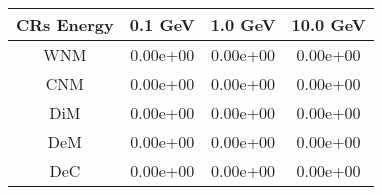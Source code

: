 \begin{tabular}{cccc} 
\hline 
CRs Energy & 0.1 GeV & 1.0 GeV & 10.0 GeV \\ 
\hline 
WNM & 0.00e+00  & 0.00e+00  & 0.00e+00 \\ 
CNM & 0.00e+00  & 0.00e+00  & 0.00e+00 \\ 
DiM & 0.00e+00  & 0.00e+00  & 0.00e+00 \\ 
DeM & 0.00e+00  & 0.00e+00  & 0.00e+00 \\ 
DeC & 0.00e+00  & 0.00e+00  & 0.00e+00 \\ 
\hline 
\end{tabular}